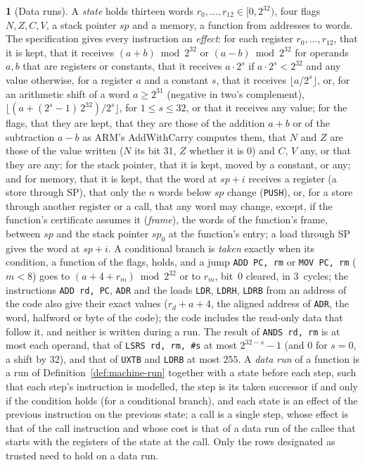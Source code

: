 \documentclass[oneside,english]{amsart}
\numberwithin{equation}{section}
\theoremstyle{plain}
\theoremstyle{definition}
\newtheorem{defn}[thm]{\protect\definitionname}
\theoremstyle{plain}
\theoremstyle{plain}
\theoremstyle{remark}
\providecommand{\definitionname}{Definition}
\begin{document}
\begin{defn}[Data runs]
\label{def:data-run}
A \emph{state} holds thirteen words $r_0, \dots, r_{12} \in [0, 2^{32})$, four flags $N, Z, C, V$, a stack pointer $\mathit{sp}$ and a memory, a function from addresses to words. The specification gives every instruction an \emph{effect}: for each register $r_0, \dots, r_{12}$, that it is kept, that it receives $(a + b) \bmod 2^{32}$ or $(a - b) \bmod 2^{32}$ for operands $a, b$ that are registers or constants, that it receives $a \cdot 2^{s}$ if $a \cdot 2^{s} < 2^{32}$ and any value otherwise, for a register $a$ and a constant $s$, that it receives $\lfloor a / 2^{s} \rfloor$, or, for an arithmetic shift of a word $a \ge 2^{31}$ (negative in two's complement), $\lfloor (a + (2^{s} - 1)\, 2^{32}) / 2^{s} \rfloor$, for $1 \le s \le 32$, or that it receives any value; for the flags, that they are kept, that they are those of the addition $a + b$ or of the subtraction $a - b$ as ARM's AddWithCarry computes them, that $N$ and $Z$ are those of the value written ($N$ its bit 31, $Z$ whether it is $0$) and $C$, $V$ any, or that they are any; for the stack pointer, that it is kept, moved by a constant, or any; and for memory, that it is kept, that the word at $\mathit{sp} + i$ receives a register (a store through SP), that only the $n$ words below $\mathit{sp}$ change (\texttt{PUSH}), or, for a store through another register or a call, that any word may change, except, if the function's certificate assumes it (\emph{frame}), the words of the function's frame, between $\mathit{sp}$ and the stack pointer $\mathit{sp}_0$ at the function's entry; a load through SP gives the word at $\mathit{sp} + i$. A conditional branch is \emph{taken} exactly when its condition, a function of the flags, holds, and a jump \texttt{ADD PC, rm} or \texttt{MOV PC, rm} ($m < 8$) goes to $(a + 4 + r_m) \bmod 2^{32}$ or to $r_m$, bit~0 cleared, in 3~cycles; the instructions \texttt{ADD rd, PC}, \texttt{ADR} and the loads \texttt{LDR}, \texttt{LDRH}, \texttt{LDRB} from an address of the code also give their exact values ($r_d + a + 4$, the aligned address of \texttt{ADR}, the word, halfword or byte of the code); the code includes the read-only data that follow it, and neither is written during a run. The result of \texttt{ANDS rd, rm} is at most each operand, that of \texttt{LSRS rd, rm, \#s} at most $2^{32 - s} - 1$ (and $0$ for $s = 0$, a shift by 32), and that of \texttt{UXTB} and \texttt{LDRB} at most $255$. A \emph{data run} of a function is a run of Definition~\ref{def:machine-run} together with a state before each step, such that each step's instruction is modelled, the step is its taken successor if and only if the condition holds (for a conditional branch), and each state is an effect of the previous instruction on the previous state; a call is a single step, whose effect is that of the call instruction and whose cost is that of a data run of the callee that starts with the registers of the state at the call. Only the rows designated as trusted need to hold on a data run.
\end{defn}
\end{document}
